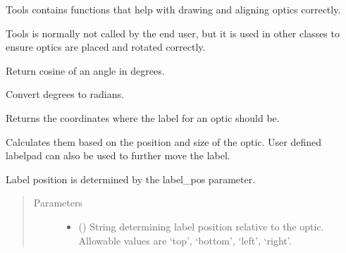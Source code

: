 \documentclass[letterpaper,10pt,english]{sphinxmanual}
\begin{document}
\begin{fulllineitems}
\label{\detokenize{index:pyopticaltable.Tools}}
\sphinxAtStartPar
Tools contains functions that help with drawing and aligning optics correctly.

\sphinxAtStartPar
Tools is normally not called by the end user, but it is used in other classes
to ensure optics are placed and rotated correctly.

\begin{fulllineitems}
\label{\detokenize{index:pyopticaltable.Tools.cosd}}
\sphinxAtStartPar
Return cosine of an angle in degrees.

\end{fulllineitems}


\begin{fulllineitems}
\label{\detokenize{index:pyopticaltable.Tools.deg_to_rad}}
\sphinxAtStartPar
Convert degrees to radians.

\end{fulllineitems}


\begin{fulllineitems}
\label{\detokenize{index:pyopticaltable.Tools.get_label_coords}}
\sphinxAtStartPar
Returns the coordinates where the label for an optic should be.

\sphinxAtStartPar
Calculates them based on the position and size of the optic. User defined
labelpad can also be used to further move the label.

\sphinxAtStartPar
Label position is determined by the label\_pos parameter.
\begin{quote}\begin{description}
\item[{Parameters}] \leavevmode\begin{itemize}
\item {} 
\sphinxAtStartPar
{} () \textendash{} String determining label position relative to the optic. Allowable
values are ‘top’, ‘bottom’, ‘left’, ‘right’.


\end{itemize}
\end{description}
\end{quote}
\end{fulllineitems}
\end{fulllineitems}
\end{document}
